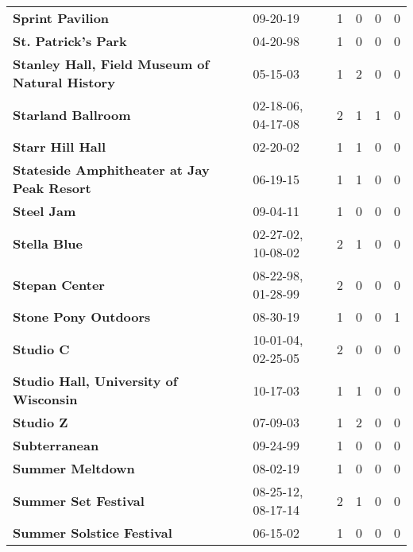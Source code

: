 \begin{supertabular}{p{0.4\textwidth}p{0.3\textwidth}p{0.05\textwidth}p{0.05\textwidth}p{0.05\textwidth}p{0.05\textwidth}}
                                             \textbf{Sprint Pavilion} &            09-20-19 &  1 &  0 &  0 &  0 \\
                                          \textbf{St. Patrick's Park} &            04-20-98 &  1 &  0 &  0 &  0 \\
               \textbf{Stanley Hall, Field Museum of Natural History} &            05-15-03 &  1 &  2 &  0 &  0 \\
                                           \textbf{Starland Ballroom} &  02-18-06, 04-17-08 &  2 &  1 &  1 &  0 \\
                                             \textbf{Starr Hill Hall} &            02-20-02 &  1 &  1 &  0 &  0 \\
                   \textbf{Stateside Amphitheater at Jay Peak Resort} &            06-19-15 &  1 &  1 &  0 &  0 \\
                                                   \textbf{Steel Jam} &            09-04-11 &  1 &  0 &  0 &  0 \\
                                                 \textbf{Stella Blue} &  02-27-02, 10-08-02 &  2 &  1 &  0 &  0 \\
                                               \textbf{Stepan Center} &  08-22-98, 01-28-99 &  2 &  0 &  0 &  0 \\
                                         \textbf{Stone Pony Outdoors} &            08-30-19 &  1 &  0 &  0 &  1 \\
                                                    \textbf{Studio C} &  10-01-04, 02-25-05 &  2 &  0 &  0 &  0 \\
                        \textbf{Studio Hall, University of Wisconsin} &            10-17-03 &  1 &  1 &  0 &  0 \\
                                                    \textbf{Studio Z} &            07-09-03 &  1 &  2 &  0 &  0 \\
                                                \textbf{Subterranean} &            09-24-99 &  1 &  0 &  0 &  0 \\
                                             \textbf{Summer Meltdown} &            08-02-19 &  1 &  0 &  0 &  0 \\
                                         \textbf{Summer Set Festival} &  08-25-12, 08-17-14 &  2 &  1 &  0 &  0 \\
                                    \textbf{Summer Solstice Festival} &            06-15-02 &  1 &  0 &  0 &  0 \\

\end{supertabular}
